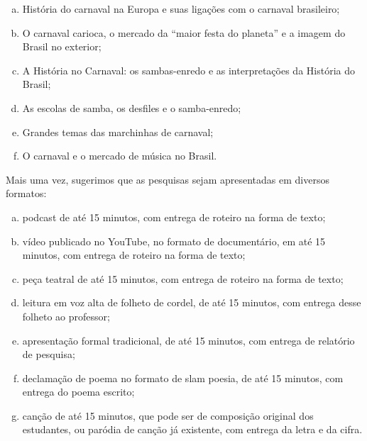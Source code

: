 \documentclass[11pt]{extarticle}
\begin{document}
\begin{enumerate}[(a)]  

\item História do carnaval na Europa e suas ligações com o carnaval
brasileiro;

\item O carnaval carioca, o mercado da ``maior festa do planeta'' e a
imagem do Brasil no exterior;

\item A História no Carnaval: os sambas-enredo e as interpretações da
História do Brasil;

\item As escolas de samba, os desfiles e o samba-enredo;

\item Grandes temas das marchinhas de carnaval;

\item O carnaval e o mercado de música no Brasil.

\end{enumerate} 


Mais uma vez, sugerimos que as pesquisas sejam apresentadas em diversos
formatos:


\begin{enumerate}[(a)]  

\item podcast de até 15 minutos, com entrega de roteiro na forma de texto;

\item vídeo publicado no YouTube, no formato de documentário, em até 15
minutos, com entrega de roteiro na forma de texto;

\item peça teatral de até 15 minutos, com entrega de roteiro na forma de
texto;

\item leitura em voz alta de folheto de cordel, de até 15 minutos, com
entrega desse folheto ao professor;

\item apresentação formal tradicional, de até 15 minutos, com entrega de
relatório de pesquisa;

\item declamação de poema no formato de slam poesia, de até 15 minutos, com
entrega do poema escrito;

\item canção de até 15 minutos, que pode ser de composição original dos
estudantes, ou paródia de canção já existente, com entrega da letra e da
cifra.

\end{enumerate} 
\end{document}
